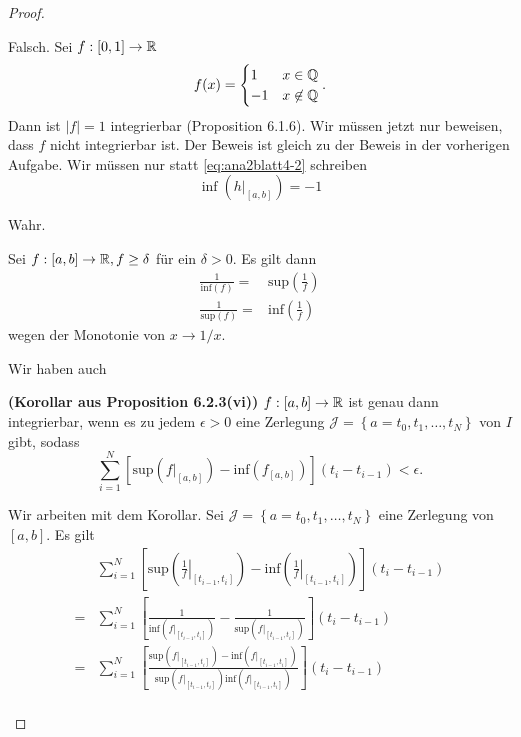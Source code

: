 \begin{proof}
	\begin{parts}
	\item Falsch. Sei $f:[0,1]\to \mathbb{R}$
		\[
		f(x)=\begin{cases}
			1 & x\in \mathbb{Q}\\
			-1 & x\not\in \mathbb{Q}
		\end{cases}
		.\] 
		Dann ist $|f|=1$ integrierbar (Proposition 6.1.6). Wir müssen jetzt nur beweisen, dass $f$ nicht integrierbar ist. Der Beweis ist gleich zu der Beweis in der vorherigen Aufgabe. Wir müssen nur statt \eqref{eq:ana2blatt4-2} schreiben
		\[
		\inf\left(h|_{[a,b]}\right)=-1
		\]
	\item Wahr. 
		\begin{tcolorbox}[title=Bemerkung]
			Sei $f:[a,b]\to \mathbb{R}, f\ge \delta$ f\"{u}r ein $\delta>0$. Es gilt dann
			\begin{align*}
				\frac{1}{\text{inf}(f)}=&\text{sup}\left( \frac{1}{f} \right) \\
				\frac{1}{\text{sup}(f)}=&\text{inf}\left( \frac{1}{f} \right) 
			\end{align*}
			wegen der Monotonie von $x\to 1 / x$.
		\end{tcolorbox}
		Wir haben auch
		\begin{tcolorbox}[title=Korollar]
			\textbf{(Korollar aus Proposition 6.2.3(vi))} $f:[a,b]\to \mathbb{R}$ ist genau dann integrierbar, wenn es zu jedem $\epsilon>0$ eine Zerlegung $\mathcal{J}=\left\{ a=t_0,t_1,\dots,t_N \right\} $ von $I$ gibt, sodass
			\[
				\sum_{i=1}^{N} \left[ \text{sup}\left( f|_{[a,b]} \right) -\text{inf}\left( f_{[a,b]} \right)  \right](t_i-t_{i-1})<\epsilon 
			.\] 
		\end{tcolorbox}
		Wir arbeiten mit dem Korollar. Sei $\mathcal{J}=\left\{ a=t_0,t_1,\dots,t_N \right\} $ eine Zerlegung von $[a,b]$. Es gilt
		\begin{align*}
		&	\sum_{i=1}^{N} \left[ \text{sup}\left( \left.\frac{1}{f}\right|_{[t_{i-1},t_i]}\right)-\text{inf}\left( \left.\frac{1}{f}\right|_{[t_{i-1},t_i]} \right)  \right](t_i-t_{i-1})\\
			=&\sum_{i=1}^{N} \left[ \frac{1}{\text{inf}\left( f|_{[t_{i-1},t_i]} \right) }-\frac{1}{\text{sup}\left( f|_{[t_{i-1},t_i]} \right) } \right](t_i-t_{i-1})\\
			=&\sum_{i=1}^{N} \left[\frac{\text{sup}\left( f|_{[t_{i-1},t_i]} \right) -\text{inf}\left( f|_{[t_{i-1},t_i]} \right)}{\text{sup}\left( f|_{[t_{i-1},t_i]} \right)\text{inf}\left( f|_{[t_{i-1},t_i]} \right) }  \right](t_i-t_{i-1})\\

\end{align*}
\end{parts}
\end{proof}

